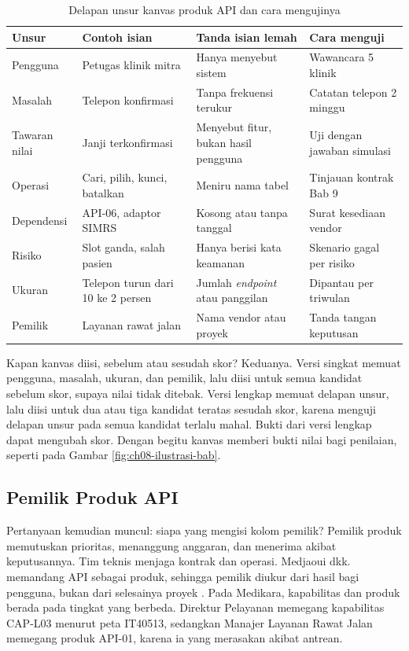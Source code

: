 \begin{table}[!htb]
  \centering
  \caption{Delapan unsur kanvas produk API dan cara mengujinya}
  \label{tab:ch08-kanvas}
  \footnotesize
  \begin{tabularx}{\textwidth}{F{1.8cm}EEE}
    \hline
    \textbf{Unsur} & \textbf{Contoh isian} & \textbf{Tanda isian lemah} & \textbf{Cara menguji} \\ \hline
    Pengguna & Petugas klinik mitra & Hanya menyebut sistem & Wawancara 5 klinik \\ \hline
    Masalah & Telepon konfirmasi & Tanpa frekuensi terukur & Catatan telepon 2 minggu \\ \hline
    Tawaran nilai & Janji terkonfirmasi & Menyebut fitur, bukan hasil pengguna & Uji dengan jawaban simulasi \\ \hline
    Operasi & Cari, pilih, kunci, batalkan & Meniru nama tabel & Tinjauan kontrak Bab 9 \\ \hline
    Dependensi & API-06, adaptor SIMRS & Kosong atau tanpa tanggal & Surat kesediaan vendor \\ \hline
    Risiko & Slot ganda, salah pasien & Hanya berisi kata keamanan & Skenario gagal per risiko \\ \hline
    Ukuran & Telepon turun dari 10 ke 2 persen & Jumlah \textit{endpoint} atau panggilan & Dipantau per triwulan \\ \hline
    Pemilik & Layanan rawat jalan & Nama vendor atau proyek & Tanda tangan keputusan \\ \hline
  \end{tabularx}
\end{table}

Kapan kanvas diisi, sebelum atau sesudah skor? Keduanya. Versi singkat memuat pengguna, masalah, ukuran, dan pemilik, lalu diisi
untuk semua kandidat sebelum skor, supaya nilai tidak ditebak. Versi lengkap memuat delapan unsur, lalu diisi untuk dua atau tiga
kandidat teratas sesudah skor, karena menguji delapan unsur pada semua kandidat terlalu mahal. Bukti dari versi lengkap dapat
mengubah skor. Dengan begitu kanvas memberi bukti nilai bagi penilaian, seperti pada Gambar \ref{fig:ch08-ilustrasi-bab}.

\subsection{Pemilik Produk API}

Pertanyaan kemudian muncul: siapa yang mengisi kolom pemilik? Pemilik produk memutuskan prioritas, menanggung anggaran, dan menerima
akibat keputusannya. Tim teknis menjaga kontrak dan operasi. Medjaoui dkk. memandang API sebagai produk, sehingga pemilik diukur dari
hasil bagi pengguna, bukan dari selesainya proyek \cite{medjaoui2021continuous}. Pada Medikara, kapabilitas dan produk berada pada
tingkat yang berbeda. Direktur Pelayanan memegang kapabilitas CAP-L03 menurut peta IT40513, sedangkan Manajer Layanan Rawat Jalan
memegang produk API-01, karena ia yang merasakan akibat antrean.

